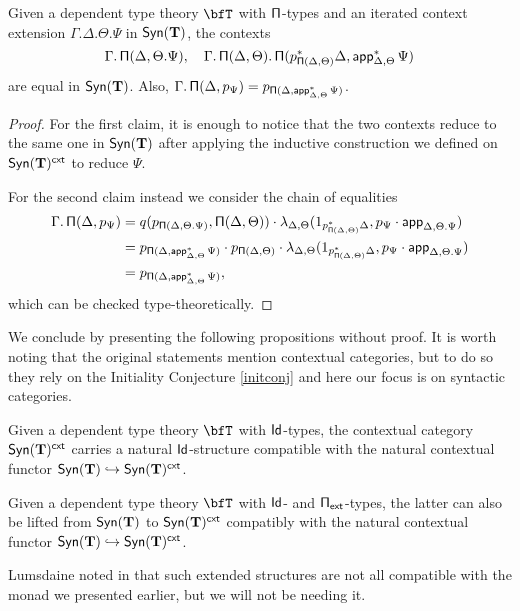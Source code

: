 \begin{lem}\label{piequal}
  Given a dependent type theory $\bfT$ with $\operatorname{\mathsf{\Pi}}$-types and an iterated context
  extension $\Gamma.\Delta.\Theta.\Psi$ in $\mathsf{Syn}(\mathbf{T})$, the contexts
  \[\Gamma.\operatorname{\mathsf{\Pi}}(\Delta,\Theta.\Psi),\quad\Gamma.\operatorname{\mathsf{\Pi}}(\Delta,\Theta).\operatorname{\mathsf{\Pi}}(p^*_{\operatorname{\mathsf{\Pi}}(\Delta,\Theta)}\Delta,\operatorname{\mathsf{app}}^*_{\Delta,\Theta}\Psi)\]
  are equal in $\mathsf{Syn}(\mathbf{T})$. Also,
  $\Gamma.\operatorname{\mathsf{\Pi}}(\Delta,p_{\Psi})=p_{\operatorname{\mathsf{\Pi}}(\Delta,\operatorname{\mathsf{app}}^*_{\Delta,\Theta}\Psi)}$.
\end{lem}
\begin{proof}
  For the first claim, it is enough to notice that the two contexts reduce to
  the same one in $\mathsf{Syn}(\mathbf{T})$ after applying the inductive construction we defined
  on $\mathsf{Syn}(\mathbf{T})^{\operatorname{\mathsf{cxt}}}$ to reduce $\Psi$.

  For the second claim instead we consider the chain of equalities
  \begin{align*}
    \Gamma.\operatorname{\mathsf{\Pi}}(\Delta,p_{\Psi})
    &=q(p_{\operatorname{\mathsf{\Pi}}(\Delta,\Theta.\Psi)},\operatorname{\mathsf{\Pi}}(\Delta,\Theta))\cdot
    \lambda_{\Delta,\Theta}(1_{p^*_{\operatorname{\mathsf{\Pi}}(\Delta,\Theta)}\Delta},p_\Psi\cdot\operatorname{\mathsf{app}}_{\Delta,\Theta.\Psi}) \\
    &=p_{\operatorname{\mathsf{\Pi}}(\Delta,\operatorname{\mathsf{app}}^*_{\Delta,\Theta}\Psi)}\cdot
    p_{\operatorname{\mathsf{\Pi}}(\Delta,\Theta)}\cdot
    \lambda_{\Delta,\Theta}(1_{p^*_{\operatorname{\mathsf{\Pi}}(\Delta,\Theta)}\Delta},p_\Psi\cdot\operatorname{\mathsf{app}}_{\Delta,\Theta.\Psi}) \\
    &=p_{\operatorname{\mathsf{\Pi}}(\Delta,\operatorname{\mathsf{app}}^*_{\Delta,\Theta}\Psi)},
  \end{align*}
  which can be checked type-theoretically.
\end{proof}

We conclude by presenting the following propositions without proof. It is worth
noting that the original statements mention contextual categories, but to do so
they rely on the Initiality Conjecture \ref{initconj} and here our focus is on
syntactic categories.

\begin{lem}
  Given a dependent type theory $\bfT$ with $\operatorname{\mathsf{Id}}$-types, the contextual category
  $\mathsf{Syn}(\mathbf{T})^{\operatorname{\mathsf{cxt}}}$ carries a natural $\operatorname{\mathsf{Id}}$-structure compatible with the
  natural contextual functor $\mathsf{Syn}(\mathbf{T})\hookrightarrow\mathsf{Syn}(\mathbf{T})^{\operatorname{\mathsf{cxt}}}$.
\end{lem}

\begin{lem}[{\cite[Lemma 2.28]{KS19}}]
  Given a dependent type theory $\bfT$ with $\operatorname{\mathsf{Id}}$- and $\operatorname{\mathsf{\Pi_{ext}}}$-types,
  the latter can also be lifted from $\mathsf{Syn}(\mathbf{T})$ to
  $\mathsf{Syn}(\mathbf{T})^{\operatorname{\mathsf{cxt}}}$ compatibly with the natural contextual functor
  $\mathsf{Syn}(\mathbf{T})\hookrightarrow\mathsf{Syn}(\mathbf{T})^{\operatorname{\mathsf{cxt}}}$.
\end{lem}

\begin{rmk}
  Lumsdaine noted in \cite[Rem.\ 1.3.1]{Lum10} that such extended structures are
  not all compatible with the monad we presented earlier, but we will not be
  needing it.
\end{rmk}
